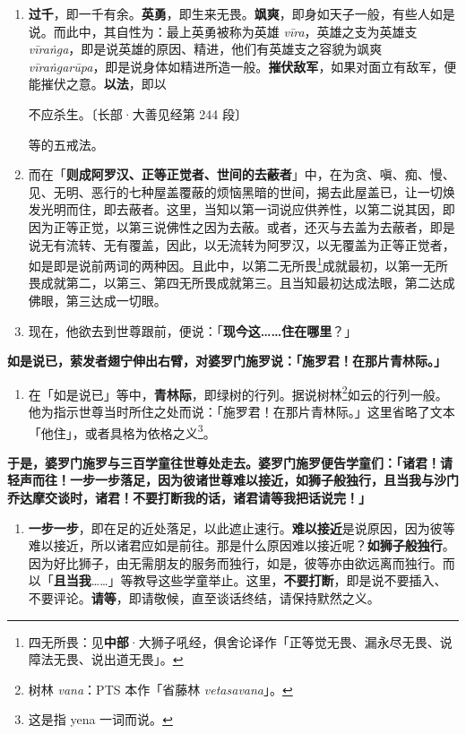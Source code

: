 \begin{enumerate}
\item \textbf{过千}，即一千有余。\textbf{英勇}，即生来无畏。\textbf{飒爽}，即身如天子一般，有些人如是说。而此中，其自性为：最上英勇被称为英雄 \textit{vīra}，英雄之支为英雄支 \textit{vīraṅga}，即是说英雄的原因、精进，他们有英雄支之容貌为飒爽 \textit{vīraṅgarūpa}，即是说身体如精进所造一般。\textbf{摧伏敌军}，如果对面立有敌军，便能摧伏之意。\textbf{以法}，即以\begin{quoting}不应杀生。{\bluefootnotesize 〔长部·大善见经第 244 段〕}\end{quoting}等的五戒法。
\item 而在「\textbf{则成阿罗汉、正等正觉者、世间的去蔽者}」中，在为贪、嗔、痴、慢、见、无明、恶行的七种屋盖覆蔽的烦恼黑暗的世间，揭去此屋盖已，让一切焕发光明而住，即去蔽者。这里，当知以第一词说应供养性，以第二说其因，即因为正等正觉，以第三说佛性之因为去蔽。或者，还灭与去盖为去蔽者，即是说无有流转、无有覆盖，因此，以无流转为阿罗汉，以无覆盖为正等正觉者，如是即是说前两词的两种因。且此中，以第二无所畏\footnote{四无所畏：见\textbf{中部}·大狮子吼经，俱舍论译作「正等觉无畏、漏永尽无畏、说障法无畏、说出道无畏」。}成就最初，以第一无所畏成就第二，以第三、第四无所畏成就第三。且当知最初达成法眼，第二达成佛眼，第三达成一切眼。
\item 现在，他欲去到世尊跟前，便说：「\textbf{现今这……住在哪里}？」\end{enumerate}

\textbf{如是说已，萦发者翅宁伸出右臂，对婆罗门施罗说：「施罗君！在那片青林际。」}

\begin{enumerate}\item 在「如是说已」等中，\textbf{青林际}，即绿树的行列。据说树林\footnote{树林 \textit{vana}：PTS 本作「省藤林 \textit{vetasavana}」。}如云的行列一般。他为指示世尊当时所住之处而说：「施罗君！在那片青林际。」这里省略了文本「他住」，或者具格为依格之义\footnote{这是指 yena 一词而说。}。\end{enumerate}

\textbf{于是，婆罗门施罗与三百学童往世尊处走去。婆罗门施罗便告学童们：「诸君！请轻声而往！一步一步落足，因为彼诸世尊难以接近，如狮子般独行，且当我与沙门乔达摩交谈时，诸君！不要打断我的话，诸君请等我把话说完！」}

\begin{enumerate}\item \textbf{一步一步}，即在足的近处落足，以此遮止速行。\textbf{难以接近}是说原因，因为彼等难以接近，所以诸君应如是前往。那是什么原因难以接近呢？\textbf{如狮子般独行}。因为好比狮子，由无需朋友的服务而独行，如是，彼等亦由欲远离而独行。而以「\textbf{且当我}……」等教导这些学童举止。这里，\textbf{不要打断}，即是说不要插入、不要评论。\textbf{请等}，即请敬候，直至谈话终结，请保持默然之义。\end{enumerate}

